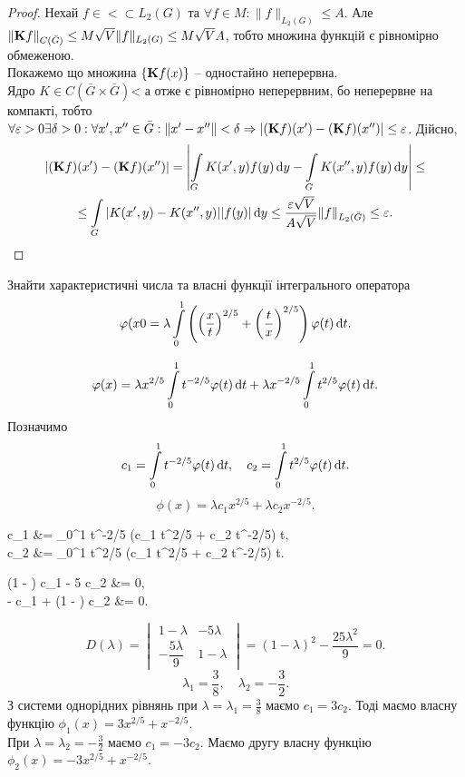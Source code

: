 \begin{proof}
	Нехай $f \in < \subset L_2(G)$ та $\forall f \in M: \|f\|_{L_2(G)} \le A$. Але $\|\bf{K} f\|_{C(\bar G)} \le M \sqrt{V} \|f\|_{L_2(G)} \le M \sqrt{V} A$, тобто множина функцій є рівномірно обмеженою. \\

	Покажемо що множина $\{ \bf{K}f(x)\}$ -- одностайно неперервна. \\

	Ядро $K \in C(\bar G \times \bar G)$< а отже є рівномірно неперервним, бо неперервне на компакті, тобто $\forall \epsilon > 0 \exists \delta > 0: \forall x', x'' \in \bar G: \|x' - x''\| < \delta \Rightarrow |(\bf{K}f)(x') - (\bf{K}f)(x'')| \le \epsilon$. Дійсно,
	\begin{multline*}
		|(\bf{K}f)(x') - (\bf{K}f)(x'')| = \left| \Int_G K(x', y) f(y) \diff y - \Int_G K(x'', y) f(y) \diff y \right| \le \\
		\le \Int_G |K(x', y) - K(x'', y)| |f(y)| \diff y \le \dfrac{\epsilon \sqrt{V}}{A \sqrt{V}} \|f\|_{L_2(\bar G)} \le \epsilon.
	\end{multline*}
\end{proof}

\begin{example}
	Знайти характеристичні числа та власні функції інтегрального оператора \[ \phi(x0 = \lambda \Int_0^1 \left( \left( \dfrac{x}{t} \right)^{2/5} + \left( \dfrac{t}{x} \right)^{2/5} \right) \phi(t) \diff t. \]
\end{example}
\begin{solution*}
	\[ \phi(x) = \lambda x^{2 / 5} \Int_0^1 t^{-2/5} \phi(t) \diff t + \lambda x^{-2/5} \Int_0^1 t^{2/5} \phi(t) \diff t. \]
	Позначимо
	\[ c_1 = \Int_0^1 t^{-2/5} \phi(t) \diff t, \quad c_2 = \Int_0^1 t^{2/5} \phi(t) \diff t. \]
	\[ \phi(x) = \lambda c_1 x^{2/5} + \lambda c_2 x^{-2/5}. \]
	\begin{system*}
		c_1 &= \Int_0^1 t^{-2/5} (\lambda c_1 t^{2/5} + \lambda c_2 t^{-2/5}) \diff t, \\
		c_2 &= \Int_0^1 t^{2/5} (\lambda c_1 t^{2/5} + \lambda c_2 t^{-2/5}) \diff t.
	\end{system*}
	\begin{system*}
		(1 - \lambda) c_1 - 5 \lambda c_2 &= 0, \\
		- c_1 + (1 - \lambda) c_2 &= 0.
	\end{system*}
	\[ D(\lambda) = \begin{vmatrix} 1 - \lambda & - 5 \lambda \\ - \dfrac{5\lambda}{9} & 1 - \lambda \end{vmatrix} = (1 - \lambda)^2 - \dfrac{25\lambda^2}{9} = 0. \]
	\[ \lambda_1 = \dfrac{3}{8}, \quad \lambda_2 = - \dfrac{3}{2}. \]
	З системи однорідних рівнянь при $\lambda = \lambda_1 = \frac{3}{8}$ маємо $c_1 = 3 c_2$. Тоді маємо власну функцію $\phi_1(x) = 3 x^{2 / 5} + x^{-2 / 5}$. \\

	При $\lambda = \lambda_2 = - \frac{3}{2}$ маємо $c_1 = - 3 c_2$. Маємо другу власну функцію $\phi_2(x) = - 3 x^{2 / 5} + x^{-2 / 5}$.
\end{solution*}

